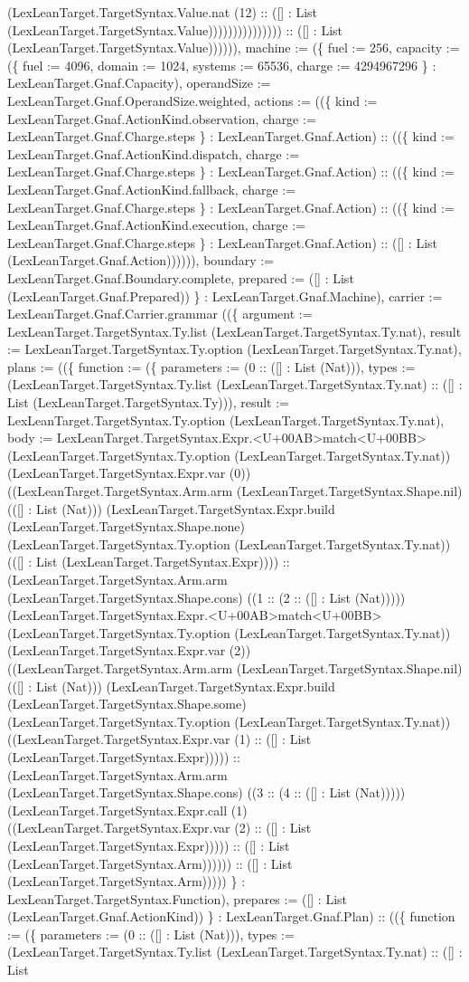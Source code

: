 \documentclass[11pt]{article}
\begin{document}
(LexLeanTarget.TargetSyntax.Value.nat (12) :: ([] : List (LexLeanTarget.TargetSyntax.Value))))))))))))))) :: ([] : List (LexLeanTarget.TargetSyntax.Value)))))), machine := (\{ fuel := 256, capacity := (\{ fuel := 4096, domain := 1024, systems := 65536, charge := 4294967296 \} : LexLeanTarget.Gnaf.Capacity), operandSize := LexLeanTarget.Gnaf.OperandSize.weighted, actions := ((\{ kind := LexLeanTarget.Gnaf.ActionKind.observation, charge := LexLeanTarget.Gnaf.Charge.steps \} : LexLeanTarget.Gnaf.Action) :: ((\{ kind := LexLeanTarget.Gnaf.ActionKind.dispatch, charge := LexLeanTarget.Gnaf.Charge.steps \} : LexLeanTarget.Gnaf.Action) :: ((\{ kind := LexLeanTarget.Gnaf.ActionKind.fallback, charge := LexLeanTarget.Gnaf.Charge.steps \} : LexLeanTarget.Gnaf.Action) :: ((\{ kind := LexLeanTarget.Gnaf.ActionKind.execution, charge := LexLeanTarget.Gnaf.Charge.steps \} : LexLeanTarget.Gnaf.Action) :: ([] : List (LexLeanTarget.Gnaf.Action)))))), boundary := LexLeanTarget.Gnaf.Boundary.complete, prepared := ([] : List (LexLeanTarget.Gnaf.Prepared)) \} : LexLeanTarget.Gnaf.Machine), carrier := LexLeanTarget.Gnaf.Carrier.grammar ((\{ argument := LexLeanTarget.TargetSyntax.Ty.list (LexLeanTarget.TargetSyntax.Ty.nat), result := LexLeanTarget.TargetSyntax.Ty.option (LexLeanTarget.TargetSyntax.Ty.nat), plans := ((\{ function := (\{ parameters := (0 :: ([] : List (Nat))), types := (LexLeanTarget.TargetSyntax.Ty.list (LexLeanTarget.TargetSyntax.Ty.nat) :: ([] : List (LexLeanTarget.TargetSyntax.Ty))), result := LexLeanTarget.TargetSyntax.Ty.option (LexLeanTarget.TargetSyntax.Ty.nat), body := LexLeanTarget.TargetSyntax.Expr.<U+00AB>match<U+00BB> (LexLeanTarget.TargetSyntax.Ty.option (LexLeanTarget.TargetSyntax.Ty.nat)) (LexLeanTarget.TargetSyntax.Expr.var (0)) ((LexLeanTarget.TargetSyntax.Arm.arm (LexLeanTarget.TargetSyntax.Shape.nil) (([] : List (Nat))) (LexLeanTarget.TargetSyntax.Expr.build (LexLeanTarget.TargetSyntax.Shape.none) (LexLeanTarget.TargetSyntax.Ty.option (LexLeanTarget.TargetSyntax.Ty.nat)) (([] : List (LexLeanTarget.TargetSyntax.Expr)))) :: (LexLeanTarget.TargetSyntax.Arm.arm (LexLeanTarget.TargetSyntax.Shape.cons) ((1 :: (2 :: ([] : List (Nat))))) (LexLeanTarget.TargetSyntax.Expr.<U+00AB>match<U+00BB> (LexLeanTarget.TargetSyntax.Ty.option (LexLeanTarget.TargetSyntax.Ty.nat)) (LexLeanTarget.TargetSyntax.Expr.var (2)) ((LexLeanTarget.TargetSyntax.Arm.arm (LexLeanTarget.TargetSyntax.Shape.nil) (([] : List (Nat))) (LexLeanTarget.TargetSyntax.Expr.build (LexLeanTarget.TargetSyntax.Shape.some) (LexLeanTarget.TargetSyntax.Ty.option (LexLeanTarget.TargetSyntax.Ty.nat)) ((LexLeanTarget.TargetSyntax.Expr.var (1) :: ([] : List (LexLeanTarget.TargetSyntax.Expr))))) :: (LexLeanTarget.TargetSyntax.Arm.arm (LexLeanTarget.TargetSyntax.Shape.cons) ((3 :: (4 :: ([] : List (Nat))))) (LexLeanTarget.TargetSyntax.Expr.call (1) ((LexLeanTarget.TargetSyntax.Expr.var (2) :: ([] : List (LexLeanTarget.TargetSyntax.Expr))))) :: ([] : List (LexLeanTarget.TargetSyntax.Arm)))))) :: ([] : List (LexLeanTarget.TargetSyntax.Arm))))) \} : LexLeanTarget.TargetSyntax.Function), prepares := ([] : List (LexLeanTarget.Gnaf.ActionKind)) \} : LexLeanTarget.Gnaf.Plan) :: ((\{ function := (\{ parameters := (0 :: ([] : List (Nat))), types := (LexLeanTarget.TargetSyntax.Ty.list (LexLeanTarget.TargetSyntax.Ty.nat) :: ([] : List 
\end{document}
